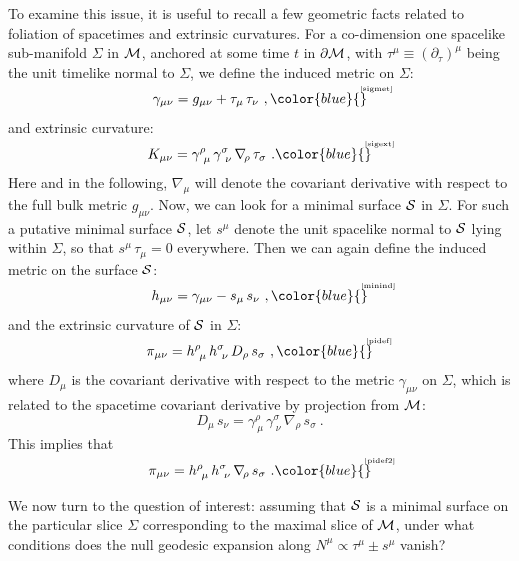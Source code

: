 \documentclass[12pt]{article}
\def\({\left (}
\def\){\right )}
\def\p{\partial}
\def\CM{{\cal M}}
\def\CS{{\cal S}}
\def\p{\partial}
\def\p{\partial}
\def\Label#1{\label{#1}%
{ \color{blue}{\smash{\hbox to0pt{\raise2ex\hbox{\tiny[#1]}\hss}}}}}
\def\bulk{{\cal M}}
\def\bdy{\p{\cal M}}
\def\ms{\CS}
\begin{document}
To examine this issue, it is useful to recall a few geometric facts
related to
 foliation of spacetimes and extrinsic curvatures.  For a co-dimension one spacelike
 sub-manifold $\Sigma$ in $\bulk$, anchored at some time $t$ in $\bdy$, with
 $\tau^\mu \equiv \(\p_\tau\)^\mu$
being the unit timelike normal to $\Sigma$, we define the induced metric on  $\Sigma$:
%
\begin{equation}
\gamma_{\mu \nu} = g_{\mu \nu} + \tau_\mu \, \tau_\nu \ ,
\Label{sigmet}
\end{equation}
%
and extrinsic curvature:
%
\begin{equation}
K_{\mu \nu} = \gamma^\rho_{\ \mu}\, \gamma^\sigma_{\ \nu} \, \nabla_{\! \rho} \, \tau_\sigma \ .
\Label{sigext}
\end{equation}
%
Here and in the following, $\nabla_{\! \mu}$ will denote the covariant derivative with respect to the full bulk metric $g_{\mu\nu}$. Now, we can look for a minimal surface $\CS$ in $\Sigma$. For such a putative minimal surface $\CS$, let $s^\mu$ denote the unit spacelike normal to  $\CS$ lying within $\Sigma$, so that $s^\mu \, \tau_\mu =0$ everywhere. Then we can again define the induced metric on the surface $\CS$:
%
\begin{equation}
h_{\mu\nu} = \gamma_{\mu\nu} - s_\mu \, s_\nu \ ,
\Label{minind}
\end{equation}
%
and the extrinsic curvature of $\CS$ in $\Sigma$:
%
\begin{equation}
\pi_{\mu \nu} = h^\rho_{\ \mu} \, h^\sigma_{\ \nu} \, D_\rho\, s_\sigma \ ,
\Label{pidef}
\end{equation}
%
where $D_\mu$ is the covariant derivative with respect to the metric $\gamma_{\mu \nu}$ on $\Sigma$, which is related to the spacetime covariant derivative by projection from $\CM$:
%
\begin{equation}
D_\mu \, s_\nu = \gamma^\rho_{\ \mu} \, \gamma^\sigma_{\ \nu} \, \nabla_{\! \rho}\, s_\sigma \ .
\end{equation}
%
This implies that
%
\begin{equation}
\pi_{\mu \nu} = h^\rho_{\ \mu}\, h^\sigma_{\ \nu}\, \nabla_{\! \rho}\, s_\sigma \ .
\Label{pidef2}
\end{equation}
%

We now turn to the question of interest: assuming  that $\ms$ is a minimal surface on the particular slice $\Sigma$ corresponding to the maximal slice of $\CM$, under what conditions does the null geodesic expansion along $N^\mu \propto \tau^\mu \pm s^\mu$ vanish?
\end{document}
